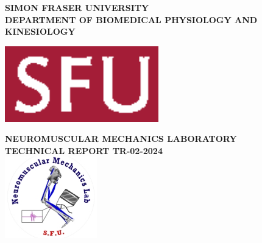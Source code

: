 \documentclass[letterpaper,11pt,oneside,titlepage]{report}
\newcommand{\reportnumber}{TR-02-2024}
\begin{document}
\thispagestyle{empty}
\setlength{\footskip}{36pt}


\begin{titlepage}

\center %
 
\vspace*{-6.5em}

\noindent\begin{minipage}[t]{0.69\textwidth}
\textbf{SIMON FRASER UNIVERSITY} \\
\textbf{DEPARTMENT OF BIOMEDICAL PHYSIOLOGY AND KINESIOLOGY} 
\end{minipage} \hfill
\begin{minipage}[r]{0.29\textwidth}
\begin{flushright}
\vspace*{-0.1cm}
\includegraphics[width=0.5\textwidth]{logos/sfu-logo.eps}
\end{flushright}
\end{minipage}


\vfill

\begin{minipage}[c]{0.8\textwidth}
\centering
\large \textbf{NEUROMUSCULAR MECHANICS LABORATORY} \\[1em]
\large \textbf{TECHNICAL REPORT \reportnumber}\\[2em]
\includegraphics[width=0.3\textwidth]{logos/nml-logo.png}
\end{minipage}


\end{titlepage}
\end{document}
